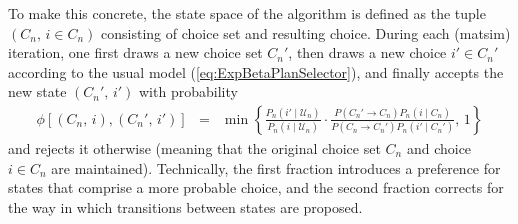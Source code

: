 To make this concrete, the state space of the algorithm is defined as the tuple
$(C_{n},\, i\in C_{n})$ consisting of choice set and resulting choice.
During each (\gls{matsim}) iteration, one first draws a new choice set $C_{n}'$,
then draws a new choice $i'\in C_{n}'$ according to the usual model (\ref{eq:ExpBetaPlanSelector}), 
and finally accepts the new state $(C_{n}',\, i')$ with probability
\begin{eqnarray}
\phi[(C_{n},\, i),(C_{n}',\, i')] 
& = & 
\min\left\{ 
\frac{{\displaystyle P_{n}(i'\mid \mathcal{U}_n)}}
{{\displaystyle P_{n}(i\mid \mathcal{U}_n)}}
\cdot
\frac{{P(C_{n}'\rightarrow C_{n})P_n(i\mid C_{n})}}
{{P(C_{n}\rightarrow C_{n}')P_n(i'\mid C_{n}')}}
,\,1\right\} 
\label{eq:accept-proba-1}
\end{eqnarray}
and rejects it otherwise (meaning that the original choice set $C_{n}$
and choice $i\in C_{n}$ are maintained).
Technically, the first fraction introduces a preference for states
that comprise a more probable choice, and the second
fraction corrects for the way in which transitions between states are
proposed.


